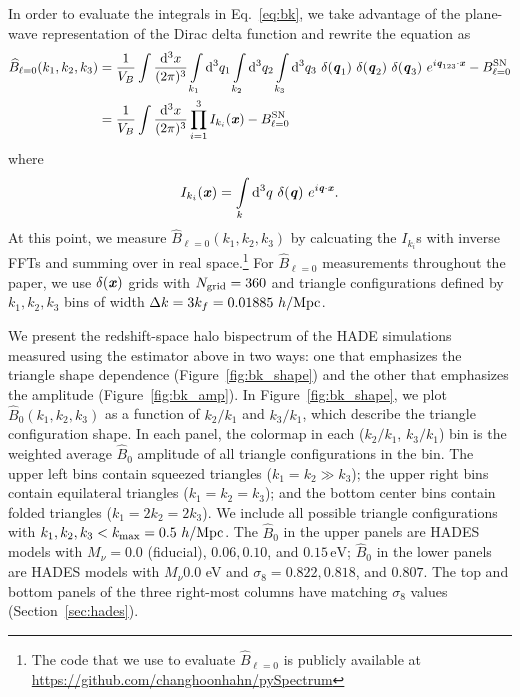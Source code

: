 \documentclass[12pt, letterpaper, preprint]{aastex62}
\newcommand{\smnu}{M_\nu}
\newcommand{\sig}{\sigma_8}
\newcommand{\BOk}{\widehat{B}_0}
\newcommand{\bfi}[1]{\textbf{\textit{#1}}}
\newcommand{\beq}{\begin{equation}}
\newcommand{\eeq}{\end{equation}}
\begin{document}
In order to evaluate the integrals in Eq.~\ref{eq:bk}, we take advantage of the plane-wave 
representation of the Dirac delta function and rewrite the equation as
\begin{align} \label{eq:bk2} 
    \widehat{B}_{\ell = 0}(k_1,k_2, k_3) &= \frac{1}{V_B} \int\frac{{\rm d}^3x}{(2\pi)^3} \int\limits_{k_1}{\rm d}^3q_1 \int\limits_{k_2}{\rm d}^3q_2 \int\limits_{k_3}{\rm d}^3q_3~\delta({\bfi q_1})~\delta({\bfi q_2})~\delta({\bfi q_3})~e^{i{\bfi q_{123}}\cdot{\bfi x}} - B^{\rm SN}_{\ell = 0}\\ 
    &= \frac{1}{V_B} \int\frac{{\rm d}^3x}{(2\pi)^3}\prod\limits_{i=1}^{3} I_{k_i}({\bfi x}) - B^{\rm SN}_{\ell = 0} 
\end{align}
where 
\beq
I_{k_i}({\bfi x}) = \int\limits_k {\rm d}^3q~\delta({\bfi q})~e^{i {\bfi q}\cdot{\bfi x}}. 
\eeq
At this point, we measure $\widehat{B}_{\ell = 0}(k_1, k_2, k_3)$ by calcuating the 
$I_{k_i}$s with inverse FFTs and summing over in real space.\footnote{The code that we use to 
evaluate $\widehat{B}_{\ell = 0}$ is publicly available at \url{https://github.com/changhoonhahn/pySpectrum}}
For $\widehat{B}_{\ell = 0}$
measurements throughout the paper, we use $\delta({\bfi x})$ grids with $N_{\rm grid} = 360$ 
and triangle configurations defined by $k_1, k_2, k_3$ bins of width 
$\Delta k = 3 k_f = 0.01885~h/{\rm Mpc}$.

We present the redshift-space halo bispectrum of the HADE simulations measured using 
the estimator above in two ways: one that emphasizes the triangle shape dependence 
(Figure~\ref{fig:bk_shape}) and the other that emphasizes the amplitude 
(Figure~\ref{fig:bk_amp}). In Figure~\ref{fig:bk_shape}, we plot $\BOk(k_1, k_2, k_3)$ 
as a function of $k_2/k_1$ and $k_3/k_1$, which describe the triangle configuration shape. 
In each panel, the colormap in each ($k_2/k_1$, $k_3/k_1$) bin is the weighted average $\BOk$ amplitude 
of all triangle configurations in the bin. The upper left bins contain squeezed triangles 
($k_1 = k_2 \gg k_3$); the upper right bins contain equilateral triangles 
($k_1 = k_2 = k_3$); and the bottom center bins contain folded triangles ($k_1 = 2 k_2 = 2 k_3$). 
We include all possible triangle configurations with $k_1, k_2, k_3 < k_{\rm max} = 0.5~h/{\rm Mpc}$. 
The $\BOk$ in the upper panels are HADES models with $\smnu = 0.0$ (fiducial), $0.06, 0.10$, 
and $0.15\,\mathrm{eV}$; $\BOk$ in the lower panels are  HADES models with $\smnu 0.0$ eV and 
$\sig = 0.822, 0.818$, and $0.807$. The top and bottom panels of the three right-most 
columns have matching $\sig$ values (Section~\ref{sec:hades}).
\end{document}
